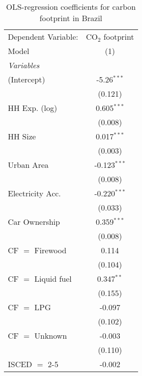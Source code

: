 
\begin{table}[htbp!]
   \centering
   \small
   \begin{adjustbox}{width = 1\textwidth, max height = 0.95\textheight, center}
      \begin{threeparttable}[b]
         \caption{\label{tab:OLS_2_BRA} OLS-regression coefficients for carbon footprint in Brazil}
         \begin{tabular}{lc}
            \tabularnewline \midrule \midrule
            Dependent Variable: & CO$_{2}$ footprint\\  
            Model               & (1)\\  
            \midrule
            \emph{Variables}\\
            (Intercept)         & -5.26$^{***}$\\   
                                & (0.121)\\   
            HH Exp. (log)       & 0.605$^{***}$\\   
                                & (0.008)\\   
            HH Size             & 0.017$^{***}$\\   
                                & (0.003)\\   
            Urban Area          & -0.123$^{***}$\\   
                                & (0.008)\\   
            Electricity Acc.    & -0.220$^{***}$\\   
                                & (0.033)\\   
            Car Ownership       & 0.359$^{***}$\\   
                                & (0.008)\\   
            CF $=$ Firewood     & 0.114\\   
                                & (0.104)\\   
            CF $=$ Liquid fuel  & 0.347$^{**}$\\   
                                & (0.155)\\   
            CF $=$ LPG          & -0.097\\   
                                & (0.102)\\   
            CF $=$ Unknown      & -0.003\\   
                                & (0.110)\\   
            ISCED $=$ 2-5       & -0.002\\   

\end{tabular}
\end{threeparttable}
\end{adjustbox}
\end{table}
